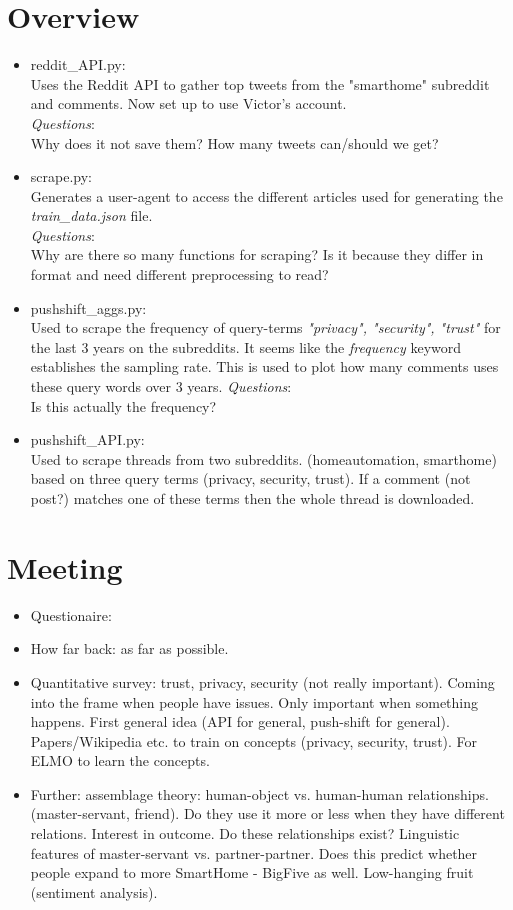 \documentclass{article}
\begin{document}
\section{Overview}
\begin{itemize}
	\item reddit\_API.py:\\
	Uses the Reddit API to gather top tweets
	from the "smarthome" subreddit and comments.
	Now set up to use Victor's account.\\
	\emph{Questions}: \\ Why does it not save them?
	How many tweets can/should we get?
	\item scrape.py:\\
	Generates a user-agent to access the different
	articles used for generating the \textit{train\_data.json} file.\\
	\emph{Questions}: \\
	Why are there so many functions for scraping?
	Is it because they differ in format and need different preprocessing to read?
	\item pushshift\_aggs.py:\\
	Used to scrape the frequency of query-terms
	\textit{"privacy", "security", "trust"} for the last 3 years on the subreddits.
	It seems like the \textit{frequency} keyword establishes the sampling rate.
	This is used to plot how many comments uses these query words over 3 years.
	\emph{Questions}: \\
	Is this actually the frequency?
	\item pushshift\_API.py:\\
	Used to scrape threads from two subreddits.
	(homeautomation, smarthome) based on three
	query terms (privacy, security, trust). If
	a comment (not post?) matches one of these
	terms then the whole thread is downloaded.
\end{itemize}

\section{Meeting}
\begin{itemize}
	\item Questionaire:
	\item How far back: as far as possible.
	\item Quantitative survey: trust, privacy, security (not really important). Coming into the frame when people have issues. Only important when something happens. First general idea (API for general, push-shift for general). Papers/Wikipedia etc. to train on concepts (privacy, security, trust). For ELMO to learn the concepts.
	\item Further: assemblage theory: human-object vs. human-human relationships. (master-servant, friend). Do they use it more or less when they have different relations. Interest in outcome. Do these relationships exist? Linguistic features of master-servant vs. partner-partner. Does this predict whether people expand to more SmartHome - BigFive as well. Low-hanging fruit (sentiment analysis).
\end{itemize}
\end{document}

